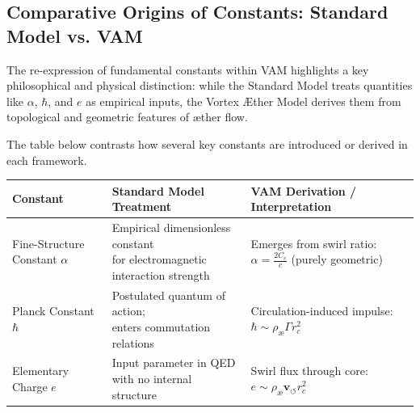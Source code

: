 \documentclass[12pt]{article}
\begin{document}
\subsection*{Comparative Origins of Constants: Standard Model vs. VAM}

The re-expression of fundamental constants within VAM highlights a key philosophical and physical distinction: while the Standard Model treats quantities like $\alpha$, $\hbar$, and $e$ as empirical inputs, the Vortex Æther Model derives them from topological and geometric features of æther flow.

The table below contrasts how several key constants are introduced or derived in each framework.

\begin{table}[H]
    \centering
    \footnotesize
    \renewcommand{\arraystretch}{1.3}
    \begin{tabular}{|l|l|l|}
        \hline
        \textbf{Constant} & \textbf{Standard Model Treatment} & \textbf{VAM Derivation / Interpretation} \\
        \hline

        \makecell[l]{Fine-Structure \\ Constant $\alpha$} &
        \makecell[l]{Empirical dimensionless constant \\ for electromagnetic interaction strength} &
        \makecell[l]{Emerges from swirl ratio: \\ $\alpha = \frac{2 C_e}{c}$ \\ (purely geometric)} \\
        \hline

        \makecell[l]{Planck Constant \\ $\hbar$} &
        \makecell[l]{Postulated quantum of action; \\ enters commutation relations} &
        \makecell[l]{Circulation-induced impulse: \\ $\hbar \sim \rho_\text{\ae} \Gamma r_c^2$} \\
        \hline

        \makecell[l]{Elementary \\ Charge $e$} &
        \makecell[l]{Input parameter in QED \\ with no internal structure} &
        \makecell[l]{Swirl flux through core: \\ $e \sim \rho_\text{\ae} \mathbf{v}_{\scriptscriptstyle\boldsymbol{\circlearrowleft}} r_c^2$} \\
        \hline


\end{tabular}
\end{table}
\end{document}
